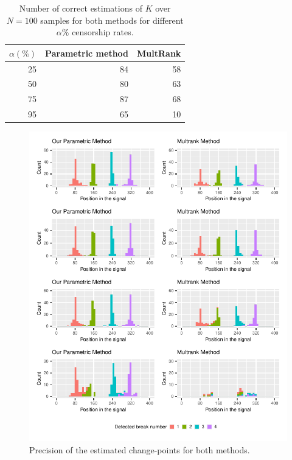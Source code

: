 \begin{table}[ht]
\centering
\begin{tabular}{|r|r|r|}
  \hline
   $\alpha(\%)$  & Parametric method & MultRank \\ 
  \hline
 25 &  84 &  58 \\ 
 50 &  80 &  63 \\ 
 75 &  87 &  68 \\ 
 95 &  65 &  10 \\ 
   \hline
\end{tabular}
\caption{Number of correct estimations of $K$ over $N=100$ samples for both methods for different $\alpha\%$ censorship rates.}
\label{tab:simcomp}
\end{table}

\begin{figure}[ht]
    \centering
    \includegraphics{figs/Chap4/detect_comp.pdf}
    \caption{Precision of the estimated change-points for both methods.}
    \label{fig:prec_sim}
\end{figure}

